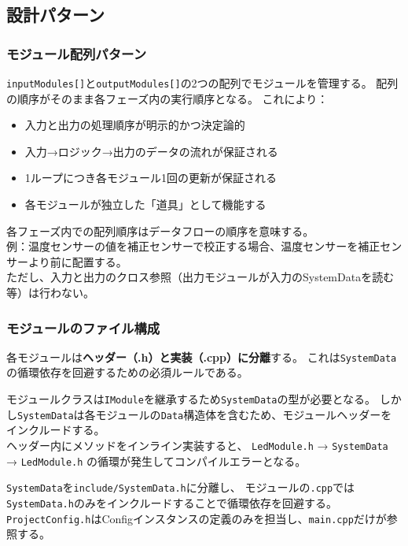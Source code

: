 \subsection{設計パターン}

\subsubsection{モジュール配列パターン}
\texttt{inputModules[]}と\texttt{outputModules[]}の2つの配列でモジュールを管理する。
配列の順序がそのまま各フェーズ内の実行順序となる。
これにより：
\begin{itemize}
    \item 入力と出力の処理順序が明示的かつ決定論的
    \item 入力→ロジック→出力のデータの流れが保証される
    \item 1ループにつき各モジュール1回の更新が保証される
    \item 各モジュールが独立した「道具」として機能する
\end{itemize}

\begin{notebox}[重要：処理順序]
各フェーズ内での配列順序はデータフローの順序を意味する。\\
例：温度センサーの値を補正センサーで校正する場合、温度センサーを補正センサーより前に配置する。\\
ただし、入力と出力のクロス参照（出力モジュールが入力のSystemDataを読む等）は行わない。
\end{notebox}

\subsubsection{モジュールのファイル構成}

各モジュールは\textbf{ヘッダー（.h）と実装（.cpp）に分離}する。
これは\texttt{SystemData}の循環依存を回避するための必須ルールである。

\begin{cautionbox}[循環依存の問題]
モジュールクラスは\texttt{IModule}を継承するため\texttt{SystemData}の型が必要となる。
しかし\texttt{SystemData}は各モジュールの\texttt{Data}構造体を含むため、モジュールヘッダーをインクルードする。\\
ヘッダー内にメソッドをインライン実装すると、
\texttt{LedModule.h} → \texttt{SystemData} → \texttt{LedModule.h}
の循環が発生してコンパイルエラーとなる。
\end{cautionbox}

\texttt{SystemData}を\texttt{include/SystemData.h}に分離し、
モジュールの\texttt{.cpp}では\texttt{SystemData.h}のみをインクルードすることで循環依存を回避する。
\texttt{ProjectConfig.h}はConfigインスタンスの定義のみを担当し、\texttt{main.cpp}だけが参照する。

